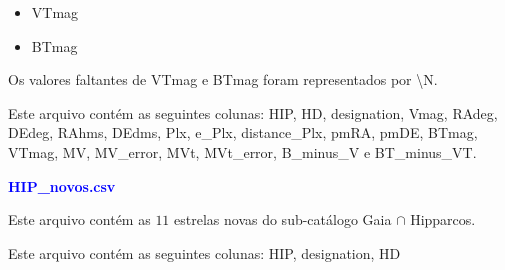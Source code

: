 \documentclass{article}
\begin{document}
	\begin{itemize}
		\item VTmag
		\item BTmag
	\end{itemize}

	Os valores faltantes de VTmag e BTmag foram representados por \textbackslash N.
	
	Este arquivo contém as seguintes colunas:
	HIP, HD, designation, Vmag, RAdeg, DEdeg, RAhms, DEdms, Plx, e\_Plx, distance\_Plx, pmRA, pmDE, BTmag, VTmag, MV, MV\_error, MVt, MVt\_error, B\_minus\_V e BT\_minus\_VT.
			
	\vspace{10pt}

	\textcolor{blue}{\textbf{HIP\_novos.csv}}
	
	\vspace{10pt}
	
	Este arquivo contém as $11$ estrelas novas do sub-catálogo  Gaia $\cap$ Hipparcos. 
	
	Este arquivo contém as seguintes colunas:
	HIP, designation, HD
	
	
\end{document}
